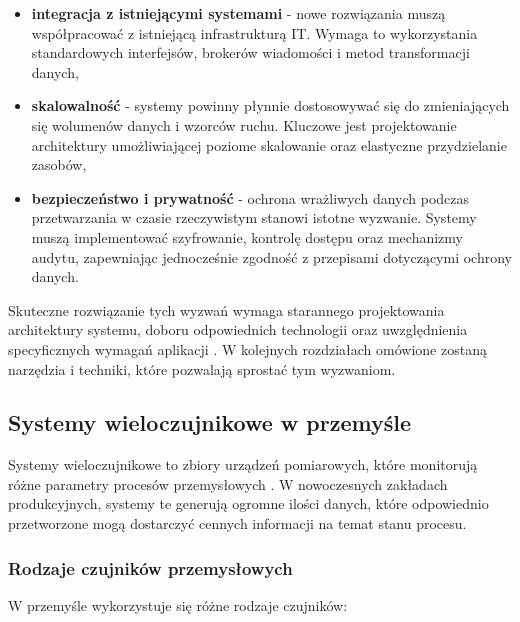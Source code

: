 \begin{itemize}
    \item \textbf{integracja z istniejącymi systemami} - nowe rozwiązania muszą współpracować z istniejącą infrastrukturą IT. Wymaga to wykorzystania standardowych interfejsów, brokerów wiadomości i metod transformacji danych,
    
    \item \textbf{skalowalność} - systemy powinny płynnie dostosowywać się do zmieniających się wolumenów danych i wzorców ruchu. Kluczowe jest projektowanie architektury umożliwiającej poziome skalowanie oraz elastyczne przydzielanie zasobów,
    
    \item \textbf{bezpieczeństwo i prywatność} - ochrona wrażliwych danych podczas przetwarzania w czasie rzeczywistym stanowi istotne wyzwanie. Systemy muszą implementować szyfrowanie, kontrolę dostępu oraz mechanizmy audytu, zapewniając jednocześnie zgodność z przepisami dotyczącymi ochrony danych.
\end{itemize}

Skuteczne rozwiązanie tych wyzwań wymaga starannego projektowania architektury systemu, doboru odpowiednich technologii oraz uwzględnienia specyficznych wymagań aplikacji \cite{geeksforgeeks_realtime}. W kolejnych rozdziałach omówione zostaną narzędzia i techniki, które pozwalają sprostać tym wyzwaniom.

\subsection{Systemy wieloczujnikowe w przemyśle}
\label{subsec:systemy_wieloczujnikowe}

Systemy wieloczujnikowe to zbiory urządzeń pomiarowych, które monitorują różne parametry procesów przemysłowych \citep{multisensor_systems}.
W nowoczesnych zakładach produkcyjnych, systemy te generują ogromne ilości danych, które odpowiednio przetworzone mogą
dostarczyć cennych informacji na temat stanu procesu.

\subsubsection{Rodzaje czujników przemysłowych}
\label{subsubsec:rodzaje_czujnikow}

W przemyśle wykorzystuje się różne rodzaje czujników:

